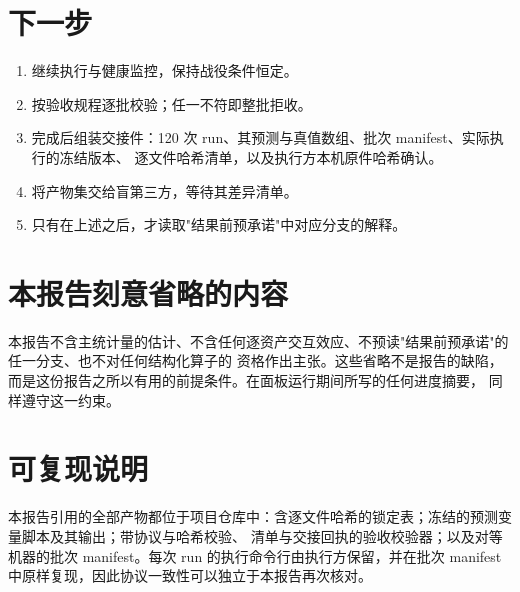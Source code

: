 \documentclass[conference]{IEEEtran}
\begin{document}
\section{下一步}
\label{sec:next}

\begin{enumerate}
\item 继续执行与健康监控，保持战役条件恒定。
\item 按验收规程逐批校验；任一不符即整批拒收。
\item 完成后组装交接件：120 次 run、其预测与真值数组、批次 manifest、实际执行的冻结版本、
逐文件哈希清单，以及执行方本机原件哈希确认。
\item 将产物集交给盲第三方，等待其差异清单。
\item 只有在上述之后，才读取"结果前预承诺"中对应分支的解释。
\end{enumerate}

\section{本报告刻意省略的内容}
\label{sec:omit}

本报告不含主统计量的估计、不含任何逐资产交互效应、不预读"结果前预承诺"的任一分支、也不对任何结构化算子的
资格作出主张。这些省略不是报告的缺陷，而是这份报告之所以有用的前提条件。在面板运行期间所写的任何进度摘要，
同样遵守这一约束。

\section*{可复现说明}

本报告引用的全部产物都位于项目仓库中：含逐文件哈希的锁定表；冻结的预测变量脚本及其输出；带协议与哈希校验、
清单与交接回执的验收校验器；以及对等机器的批次 manifest。每次 run 的执行命令行由执行方保留，并在批次 manifest
中原样复现，因此协议一致性可以独立于本报告再次核对。
\end{document}
